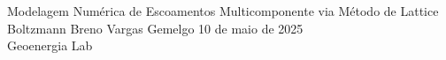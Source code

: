 \maketitleframe
{Modelagem Numérica de Escoamentos Multicomponente via Método de Lattice Boltzmann}
{Breno Vargas Gemelgo}
{10 de maio de 2025 \\ Geoenergia Lab}